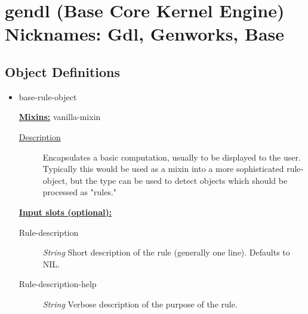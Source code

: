 \documentclass [11pt]{book}
\begin{document}
\section{gendl (Base Core Kernel Engine) Nicknames: Gdl, Genworks, Base}

\label{sec:gendl(basecorekernelengine)nicknames:gdl,genworks,base}





\subsection{Object Definitions}

\label{subsec:objectdefinitions}



\begin{itemize}

\item {}base-rule-object


\textbf{
\underline{Mixins:}} vanilla-mixin





\begin{description}

\item [
\underline{Description}]


Encapsulates a basic computation, usually to be displayed to the user.
Typically this would be used as a mixin into a more sophisticated rule-object, but the type can be
 used to detect objects which should be processed as "rules."



\end{description}








\textbf{
\underline{Input slots (optional):}}

\begin{description}

\item [Rule-description]
\emph{String} Short description of the rule (generally one line). Defaults to NIL.


\item [Rule-description-help]
\emph{String} Verbose description of the purpose of the rule.



\end{description}
\end{itemize}
\end{document}
